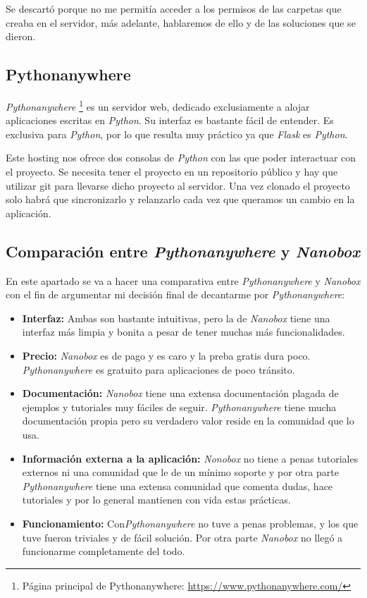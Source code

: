 Se descartó porque no me permitía acceder a los permisos de las carpetas que creaba en el servidor, más adelante, hablaremos de ello y de las soluciones que se dieron.

\subsection{Pythonanywhere}
\textit{Pythonanywhere} \footnote{Página principal de Pythonanywhere: \url{https://www.pythonanywhere.com/}} es un servidor web, dedicado exclusiamente a alojar aplicaciones escritas en \textit{Python}. Su interfaz es bastante fácil de entender. Es exclusiva para \textit{Python}, por lo que resulta muy práctico ya que \textit{Flask} es \textit{Python}.

Este hosting nos ofrece dos consolas de \textit{Python} con las que poder interactuar con el proyecto. Se necesita tener el proyecto en un repositorio público y hay que utilizar git para llevarse dicho proyecto al servidor. Una vez clonado el proyecto solo habrá que sincronizarlo y relanzarlo cada vez que queramos un cambio en la aplicación.


\subsection{Comparación entre \textit{Pythonanywhere} y \textit{Nanobox}}
En este apartado se va a hacer una comparativa entre \textit{Pythonanywhere} y \textit{Nanobox} con el fin de argumentar mi decisión final de decantarme por \textit{Pythonanywhere}:

\begin{itemize}
	\item \textbf{Interfaz:} Ambas son bastante intuitivas, pero la de \textit{Nanobox} tiene una interfaz más limpia y bonita a pesar de tener muchas más funcionalidades.
	
	\item \textbf{Precio:} \textit{Nanobox} es de pago y es caro y la preba gratis dura poco. \textit{Pythonanywhere} es gratuito para aplicaciones de poco tránsito.
	
	\item \textbf{Documentación:} \textit{Nanobox} tiene una extensa documentación plagada de ejemplos y tutoriales muy fáciles de seguir. \textit{Pythonanywhere} tiene mucha documentación propia pero su verdadero valor reside en la comunidad que lo usa.
	
	\item \textbf{Información externa a la aplicación:} \textit{Nonobox} no tiene a penas tutoriales externos ni una comunidad que le de un mínimo soporte y por otra parte \textit{Pythonanywhere} tiene una extensa comunidad que comenta dudas, hace tutoriales y por lo general mantienen con vida estas prácticas.
	
	\item \textbf{Funcionamiento:} Con\textit{Pythonanywhere} no tuve a penas problemas, y los que tuve fueron triviales y de fácil solución. Por otra parte \textit{Nanobox} no llegó a funcionarme completamente del todo.
	
\end{itemize}

